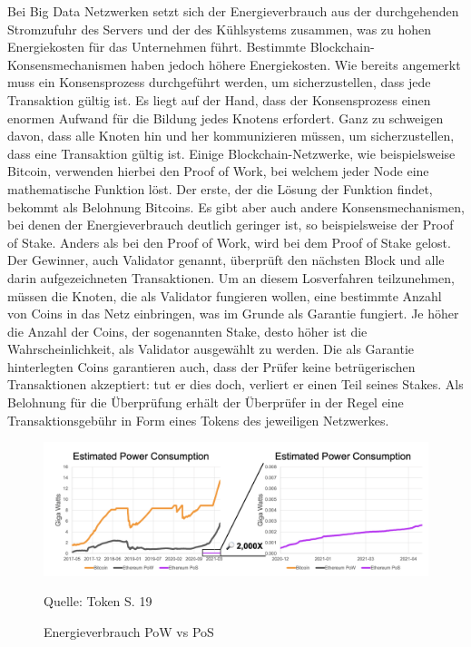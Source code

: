 Bei Big Data Netzwerken setzt sich der Energieverbrauch aus der durchgehenden Stromzufuhr des Servers und der des Kühlsystems zusammen, was zu hohen Energiekosten für das Unternehmen führt.
Bestimmte Blockchain-Konsensmechanismen haben jedoch höhere Energiekosten.
Wie bereits angemerkt muss ein Konsensprozess durchgeführt werden, um sicherzustellen, dass jede Transaktion gültig ist.
Es liegt auf der Hand, dass der Konsensprozess einen enormen Aufwand für die Bildung jedes Knotens erfordert.
Ganz zu schweigen davon, dass alle Knoten hin und her kommunizieren müssen, um sicherzustellen, dass eine Transaktion gültig ist.
Einige Blockchain-Netzwerke, wie beispielsweise Bitcoin, verwenden hierbei den Proof of Work, bei welchem jeder Node eine mathematische Funktion löst.
Der erste, der die Lösung der Funktion findet, bekommt als Belohnung Bitcoins.
Es gibt aber auch andere Konsensmechanismen, bei denen der Energieverbrauch deutlich geringer ist, so beispielsweise der Proof of Stake.
Anders als bei den Proof of Work, wird bei dem Proof of Stake gelost.
Der Gewinner, auch Validator genannt, überprüft den nächsten Block und alle darin aufgezeichneten Transaktionen.
Um an diesem Losverfahren teilzunehmen, müssen die Knoten, die als Validator fungieren wollen, eine bestimmte Anzahl von Coins in das Netz einbringen, was im Grunde als Garantie fungiert.
Je höher die Anzahl der Coins, der sogenannten Stake, desto höher ist die Wahrscheinlichkeit, als Validator ausgewählt zu werden.
Die als Garantie hinterlegten Coins garantieren auch, dass der Prüfer keine betrügerischen Transaktionen akzeptiert: tut er dies doch, verliert er einen Teil seines Stakes.
Als Belohnung für die Überprüfung erhält der Überprüfer in der Regel eine Transaktionsgebühr in Form eines Tokens des jeweiligen Netzwerkes.

\begin{figure}[!ht]
    \caption{Energieverbrauch PoW vs PoS}
    \includegraphics[scale=0.6]{assets/figures/power_consumption.jpg}
    \begin{flushleft}
        Quelle: Token S. 19
    \end{flushleft}
    \label{fig:birds4}
\end{figure}

